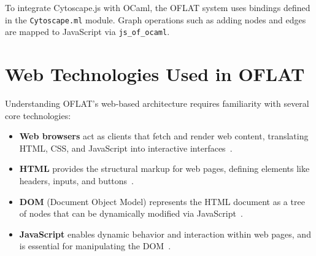 To integrate Cytoscape.js with OCaml, the OFLAT system uses bindings defined in the \texttt{Cytoscape.ml} module. 
Graph operations such as adding nodes and edges are mapped to JavaScript via \texttt{js\_of\_ocaml}.

\section{Web Technologies Used in OFLAT}

Understanding OFLAT's web-based architecture requires familiarity with several core technologies:
\begin{itemize}
    \item \textbf{Web browsers} act as clients that fetch and render web content, translating HTML, CSS, and JavaScript into interactive interfaces~\cite{webbrowsers}.
    \item \textbf{HTML} provides the structural markup for web pages, defining elements like headers, inputs, and buttons~\cite{html}.
    \item \textbf{DOM} (Document Object Model) represents the HTML document as a tree of nodes that can be dynamically modified via JavaScript~\cite{dom}.
    \item \textbf{JavaScript} enables dynamic behavior and interaction within web pages, and is essential for manipulating the DOM~\cite{javascript}.
\end{itemize}


